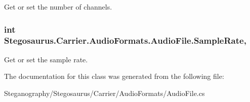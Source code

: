 Get or set the number of channels. 

\subsubsection[{\texorpdfstring{Sample\+Rate}{SampleRate}}]{\setlength{\rightskip}{0pt plus 5cm}int Stegosaurus.\+Carrier.\+Audio\+Formats.\+Audio\+File.\+Sample\+Rate\hspace{0.3cm}{\ttfamily [get]}, {}}\hypertarget{class_stegosaurus_1_1_carrier_1_1_audio_formats_1_1_audio_file_a4d08e828f8189faeb1de0a639a07ac5e}{}\label{class_stegosaurus_1_1_carrier_1_1_audio_formats_1_1_audio_file_a4d08e828f8189faeb1de0a639a07ac5e}


Get or set the sample rate. 



The documentation for this class was generated from the following file\+:\begin{DoxyCompactItemize}
\item 
Steganography/\+Stegosaurus/\+Carrier/\+Audio\+Formats/Audio\+File.\+cs\end{DoxyCompactItemize}
